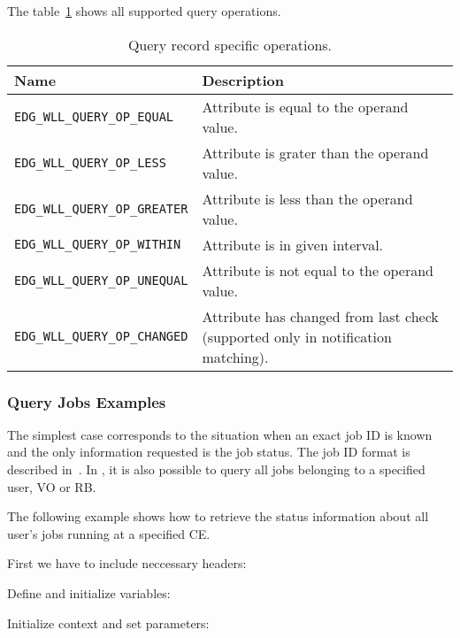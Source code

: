 The table~\ref{t:cqueryop} shows all supported query operations. 

\begin{table}[ht]
\begin{tabularx}{\textwidth}{lX}
{\bf Name} & {\bf Description} \\
\hline
\lstinline'EDG_WLL_QUERY_OP_EQUAL' & Attribute is equal to the operand value. \\
\lstinline'EDG_WLL_QUERY_OP_LESS' & Attribute is grater than the operand value. \\
\lstinline'EDG_WLL_QUERY_OP_GREATER' & Attribute is less than the operand value. \\
\lstinline'EDG_WLL_QUERY_OP_WITHIN' & Attribute is in given interval. \\
\lstinline'EDG_WLL_QUERY_OP_UNEQUAL' & Attribute is not equal to the operand value. \\
\lstinline'EDG_WLL_QUERY_OP_CHANGED' & Attribute has changed from last check (supported only in notification matching). \\
\end{tabularx}
\caption{Query record specific operations.}
\label{t:cqueryop}
\end{table}



\subsubsection{Query Jobs Examples}

The simplest case corresponds to the situation when an exact job ID
is known and the only information requested is the job status. The job ID
format is described in~\cite{djra1.4}. In \LBnew, it is also possible to
query all jobs belonging to a specified user, VO or RB.

The following example shows how to retrieve the status information
about all user's jobs running at a specified CE.

First we have to include neccessary headers:


Define and initialize variables:


Initialize context and set parameters:


